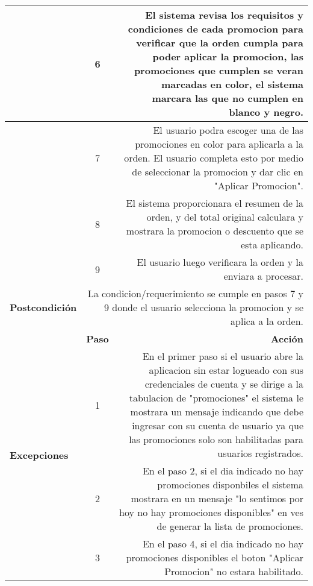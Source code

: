 \documentclass[conference]{IEEEtran}
\begin{document}
\begin{table}[H]
\begin{adjustbox}{width=0.47\textwidth}
\begin{tabular}{|p{11.215em}|r|r|}
    \midrule
    \multicolumn{1}{|r|}{} & \multicolumn{1}{c|}{6} & \multicolumn{1}{p{32em}|}{El sistema revisa los requisitos y condiciones de cada promocion para verificar que la orden cumpla para poder aplicar la promocion, las promociones que cumplen se veran marcadas en color, el sistema marcara las que no cumplen en blanco y negro.} \\
    \midrule
    \multicolumn{1}{|r|}{} & \multicolumn{1}{c|}{7} & \multicolumn{1}{p{32em}|}{El usuario podra escoger una de las promociones en color para aplicarla a la orden. El usuario completa esto por medio de seleccionar la promocion y dar clic en "Aplicar Promocion".} \\
    \midrule
    \multicolumn{1}{|r|}{} & \multicolumn{1}{c|}{8} & \multicolumn{1}{p{32em}|}{El sistema proporcionara el resumen de la orden, y del total original calculara y mostrara la promocion o descuento que se esta aplicando.} \\
    \midrule
    \multicolumn{1}{|r|}{} & \multicolumn{1}{c|}{9} & \multicolumn{1}{p{32em}|}{El usuario luego verificara la orden y la enviara a procesar.} \\
    \midrule
    \textbf{Postcondición} & \multicolumn{2}{p{37.43em}|}{La condicion/requerimiento se cumple en pasos 7 y 9 donde el usuario selecciona la promocion y se aplica a la orden.} \\
    \midrule
    \multirow{5}[10]{*}{\textbf{Excepciones}} & \multicolumn{1}{p{5.43em}|}{\textbf{Paso}} & \multicolumn{1}{p{32em}|}{\textbf{Acción}} \\
\cmidrule{2-3}    \multicolumn{1}{|c|}{} & \multicolumn{1}{c|}{1} & \multicolumn{1}{p{32em}|}{En el primer paso si el usuario abre la aplicacion sin estar logueado con sus credenciales de cuenta y se dirige a la tabulacion de "promociones" el sistema le mostrara un mensaje indicando que debe ingresar con su cuenta de usuario ya que las promociones solo son habilitadas para usuarios registrados.} \\
\cmidrule{2-3}    \multicolumn{1}{|c|}{} & \multicolumn{1}{c|}{2} & \multicolumn{1}{p{32em}|}{En el paso 2, si el dia indicado no hay promociones disponbiles el sistema mostrara en un mensaje "lo sentimos por hoy no hay promociones disponibles" en ves de generar la lista de promociones.} \\
\cmidrule{2-3}    \multicolumn{1}{|c|}{} & \multicolumn{1}{c|}{3} & \multicolumn{1}{p{32em}|}{En el paso 4, si el dia indicado no hay promociones disponibles el boton "Aplicar Promocion" no estara habilitado.} \\

\end{tabular}
\end{adjustbox}
\end{table}
\end{document}
